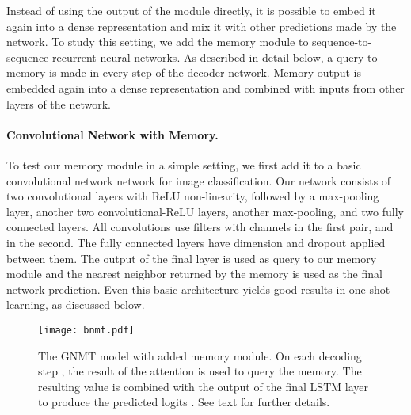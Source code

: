 \documentclass{article} \usepackage{iclr2017_conference,times}
\begin{document}
Instead of using the output of the module directly,
it is possible to embed it again into a dense representation and mix it with
other predictions made by the network. To study this setting,
we add the memory module to sequence-to-sequence recurrent neural networks.
As described in detail below, a query to memory is made in every step
of the decoder network. Memory output is embedded again into a dense
representation and combined with inputs from other layers of the network.


\paragraph{Convolutional Network with Memory.}
To test our memory module in a simple setting, we first add it to
a basic convolutional network network for image classification.
Our network consists of two convolutional layers with ReLU non-linearity,
followed by a max-pooling layer, another two convolutional-ReLU layers,
another max-pooling, and two fully connected layers. All convolutions use 
filters with  channels in the first pair, and  in the second.
The fully connected layers have dimension  and dropout applied between them.
The output of the final layer is used as query to our memory module
and the nearest neighbor returned by the memory is used as the final network prediction.
Even this basic architecture yields good results in one-shot learning,
as discussed below.

\begin{figure}
\begin{center}
\texttt{[image: bnmt.pdf]}
\end{center}
\caption{The GNMT model with added memory module.  
On each decoding step , the result of the attention  is used to 
query the memory.  The resulting value is combined with the output of the
final LSTM layer to produce the predicted logits . See text for further details.}
\label{fig:gnmt}
\end{figure}
\end{document}
